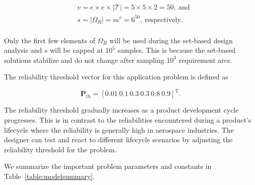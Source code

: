 \begin{equation*}
	\begin{aligned}
		& v = e \times e \times |\mathcal{T}| = 5 \times 5 \times 2 = 50,~\mathrm{and}\\
		& s = |\Omega_R| = m^v = 6^{50},~\mathrm{respectively}.\\
	\end{aligned}
\end{equation*}

Only the first few elements of $\Omega_R$ will be used during the set-based design analysis and $s$ will be capped at $10^5$ samples. This is because the set-based solutions stabilize and do not change after sampling $10^3$ requirement arcs.

The reliability threshold vector for this application problem is defined as 

\begin{equation*}
    \mathbf{P}_{th} = \left[0.01 ~ 0.1 ~ 0.3 ~ 0.3 ~ 0.8 ~ 0.9\right]^{\mathrm{T}}.
\end{equation*}

The reliability threshold gradually increases as a product development cycle progresses. This is in contrast to the reliabilities encountered during a product's lifecycle where the reliability is generally high in aerospace industries. The designer can test and react to different lifecycle scenarios by adjusting the reliability threshold for the problem.

We summarize the important problem parameters and constants in Table~\ref{table:modelsummary}.

